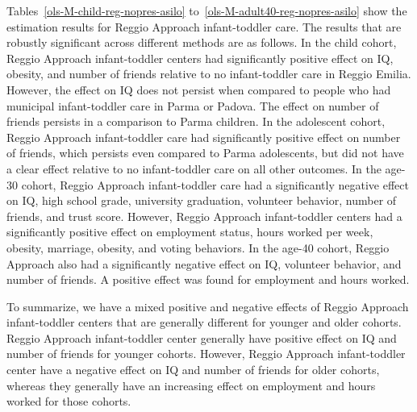 Tables~\ref{ols-M-child-reg-nopres-asilo} to~\ref{ols-M-adult40-reg-nopres-asilo} show the estimation results for Reggio Approach infant-toddler care. The results that are robustly significant across different methods are as follows. In the child cohort, Reggio Approach infant-toddler centers had significantly positive effect on IQ, obesity, and number of friends relative to no infant-toddler care in Reggio Emilia. However, the effect on IQ does not persist when compared to people who had municipal infant-toddler care in Parma or Padova. The effect on number of friends persists in a comparison to Parma children. In the adolescent cohort, Reggio Approach infant-toddler care had significantly positive effect on number of friends, which persists even compared to Parma adolescents, but did not have a clear effect relative to no infant-toddler care on all other outcomes. In the age-30 cohort, Reggio Approach infant-toddler care had a significantly negative effect on IQ, high school grade, university graduation, volunteer behavior, number of friends, and trust score. However, Reggio Approach infant-toddler centers had a significantly positive effect on employment status, hours worked per week, obesity,  marriage, obesity, and voting behaviors. In the age-40 cohort, Reggio Approach also had a significantly negative effect on IQ, volunteer behavior, and number of friends. A positive effect was found for employment and hours worked. 

To summarize, we have a mixed positive and negative effects of Reggio Approach infant-toddler centers that are generally different for younger and older cohorts. Reggio Approach infant-toddler center generally have positive effect on IQ and number of friends for younger cohorts. However, Reggio Approach infant-toddler center have a negative effect on IQ and number of friends for older cohorts, whereas they generally have an increasing effect on employment and hours worked for those cohorts. 

